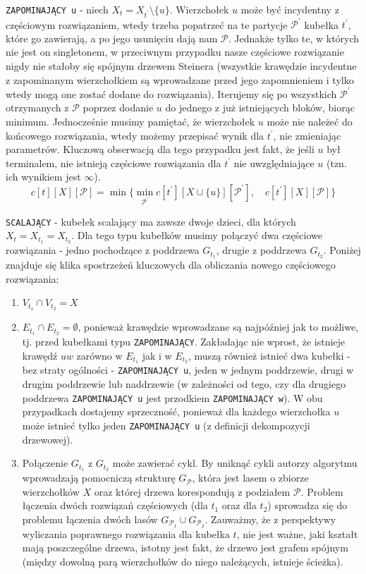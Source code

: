 \documentclass[12pt, oneside]{report}
\begin{document}
\texttt{ZAPOMINAJĄCY u} - niech $X_t = X_{t^{\prime}} \setminus \{u\}$. Wierzchołek $u$ może być incydentny z częściowym rozwiązaniem, wtedy trzeba popatrzeć na te partycje $\mathcal{P^{\prime}}$ kubełka $t^{\prime}$, które go zawierają, a po jego usunięciu dają nam $\mathcal{P}$. Jednakże tylko te, w których nie jest on singletonem, w przeciwnym przypadku nasze częściowe rozwiązanie nigdy nie stałoby się spójnym drzewem Steinera (wszystkie krawędzie incydentne z zapominanym wierzchołkiem są wprowadzane przed jego zapomnieniem i tylko wtedy mogą one zostać dodane do rozwiązania). Iterujemy się po wszystkich $\mathcal{P^{\prime}}$ otrzymanych z $\mathcal{P}$ poprzez dodanie $u$ do jednego z już istniejących bloków, biorąc minimum. Jednocześnie musimy pamiętać, że wierzchołek $u$ może nie należeć do końcowego rozwiązania, wtedy możemy przepisać wynik dla $t^{\prime}$, nie zmieniając parametrów. Kluczową obserwacją dla tego przypadku jest fakt, że jeśli $u$ był terminalem, nie istnieją częściowe rozwiązania dla $t^{\prime}$ nie uwzględniające $u$ (tzn. ich wynikiem jest $\infty$).
$$c[t][X][\mathcal{P}] = \min \big\{ \min\limits_{\mathcal{P}^{\prime}} c[t^{\prime}][X \cup \{u\}][\mathcal{P}^{\prime}], \quad c[t^{\prime}][X][\mathcal{P}] \big\}$$

\texttt{SCALAJĄCY} - kubełek scalający ma zawsze dwoje dzieci, dla których $X_t = X_{t_1} = X_{t_2}$. Dla tego typu kubełków musimy połączyć dwa częściowe rozwiązania - jedno pochodzące z poddrzewa $G_{t_1}$, drugie z poddrzewa $G_{t_2}$. Poniżej znajduje się klika spostrzeżeń kluczowych dla obliczania nowego częściowego rozwiązania:
\begin{enumerate}[label=(\alph*)]
\item $V_{t_1} \cap V_{t_2} = X$
\item $E_{t_1} \cap E_{t_2} = \emptyset$, ponieważ krawędzie wprowadzane są najpóźniej jak to możliwe, tj. przed kubełkami typu \texttt{ZAPOMINAJĄCY}. Zakładając nie wprost, że istnieje krawędź $uw$ zarówno w $E_{t_1}$ jak i w $E_{t_2}$, muszą również istnieć dwa kubełki - bez straty ogólności - \texttt{ZAPOMINAJĄCY u}, jeden w jednym poddrzewie, drugi w drugim poddrzewie lub naddrzewie (w zależności od tego, czy dla drugiego poddrzewa \texttt{ZAPOMINAJĄCY u} jest przodkiem \texttt{ZAPOMINAJĄCY w}). W obu przypadkach dostajemy sprzeczność, ponieważ dla każdego wierzchołka $u$ może istnieć tylko jeden \texttt{ZAPOMINAJĄCY u} (z definicji dekompozycji drzewowej).
\item Połączenie $G_{t_1}$ z $G_{t_2}$ może zawierać cykl. By uniknąć cykli autorzy algorytmu wprowadzają pomocniczą strukturę $G_{\mathcal{P}}$, która jest lasem o zbiorze wierzchołków $X$ oraz której drzewa korespondują z podziałem $\mathcal{P}$. Problem łączenia dwóch rozwiązań częściowych (dla $t_1$ oraz dla $t_2$) sprowadza się do problemu łączenia dwóch lasów $G_{\mathcal{P}_1} \cup G_{\mathcal{P}_2}$. Zauważmy, że z perspektywy wyliczania poprawnego rozwiązania dla kubełka $t$, nie jest ważne, jaki kształt mają poszczególne drzewa, istotny jest fakt, że drzewo jest grafem spójnym (między dowolną parą wierzchołków do niego należących, istnieje ścieżka).
\end{enumerate}
\end{document}
